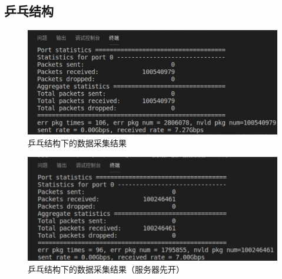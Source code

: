 \documentclass{article}
\begin{document}
\subsection{乒乓结构}
\begin{figure}[H]
	\centering
	\includegraphics[width = .8\textwidth]{res2.png}
	\caption{乒乓结构下的数据采集结果}
\end{figure}
\begin{figure}[H]
	\centering
	\includegraphics[width = .8\textwidth]{res2f.png}
	\caption{乒乓结构下的数据采集结果（服务器先开）}
\end{figure}
\end{document}
